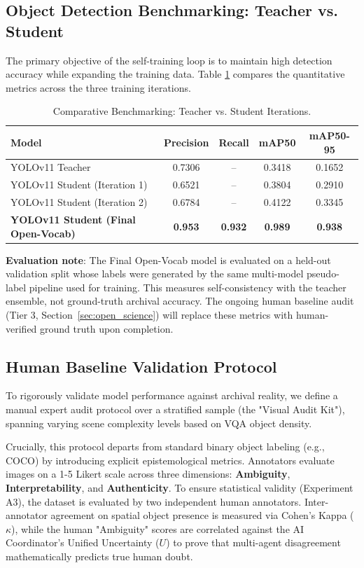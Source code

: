 \documentclass[12pt,onecolumn,a4paper]{IEEEtran}
\begin{document}
\clearpage
\subsection{Object Detection Benchmarking: Teacher vs. Student}
The primary objective of the self-training loop is to maintain high detection accuracy while expanding the training data. Table \ref{tab:model_comparison} compares the quantitative metrics across the three training iterations.

\begin{table}[!htbp]
\centering
\caption{Comparative Benchmarking: Teacher vs. Student Iterations.}
\label{tab:model_comparison}
\begin{tabular}{lcccc}
\toprule
Model & Precision & Recall & mAP50 & mAP50-95 \\
\midrule
YOLOv11 Teacher & 0.7306 & -- & 0.3418 & 0.1652 \\
YOLOv11 Student (Iteration 1) & 0.6521 & -- & 0.3804 & 0.2910 \\
YOLOv11 Student (Iteration 2) & 0.6784 & -- & 0.4122 & 0.3345 \\
\textbf{YOLOv11 Student (Final Open-Vocab)} & \textbf{0.953} & \textbf{0.932} & \textbf{0.989} & \textbf{0.938} \\
\bottomrule
\end{tabular}
\begin{flushleft}
\small{\textbf{Evaluation note}: The Final Open-Vocab model is evaluated on a held-out validation split whose labels were generated by the same multi-model pseudo-label pipeline used for training. This measures self-consistency with the teacher ensemble, not ground-truth archival accuracy. The ongoing human baseline audit (Tier 3, Section~\ref{sec:open_science}) will replace these metrics with human-verified ground truth upon completion.}
\end{flushleft}
\end{table}

\subsection{Human Baseline Validation Protocol}
To rigorously validate model performance against archival reality, we define a manual expert audit protocol over a stratified sample (the "Visual Audit Kit"), spanning varying scene complexity levels based on VQA object density. 

Crucially, this protocol departs from standard binary object labeling (e.g., COCO) by introducing explicit epistemological metrics. Annotators evaluate images on a 1-5 Likert scale across three dimensions: \textbf{Ambiguity}, \textbf{Interpretability}, and \textbf{Authenticity}. To ensure statistical validity (Experiment A3), the dataset is evaluated by two independent human annotators. Inter-annotator agreement on spatial object presence is measured via Cohen's Kappa ($\kappa$), while the human "Ambiguity" scores are correlated against the AI Coordinator's Unified Uncertainty ($U$) to prove that multi-agent disagreement mathematically predicts true human doubt. 
\end{document}
